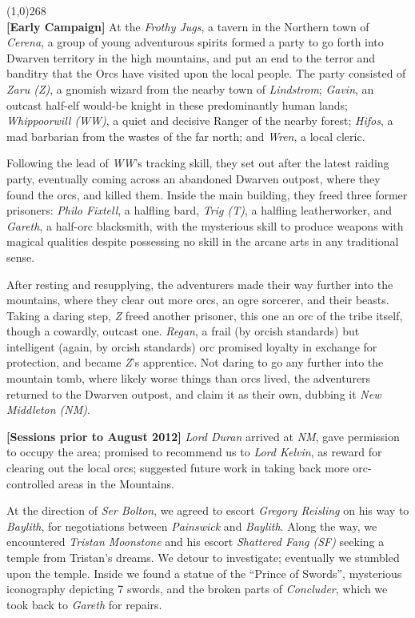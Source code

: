 \documentclass[letterpaper]{article}
\newcommand{\colline}{\noindent\line(1,0){268} \\}
\newcommand{\e}[1]{\emph{#1}}
\newcommand{\B}[1]{\textbf{#1}}
\newenvironment{notesection}[1]
{\noindent {\huge \B{#1}} \par
\vspace{-0.75em}
\colline
\begingroup\fontsize{9pt}{12pt}\selectfont}
{\endgroup}
\begin{document}
\begin{notesection}{Events}
\B{[Early Campaign]} At the \e{Frothy Jugs}, a tavern in the Northern town of \e{Cerena}, a group of young adventurous spirits formed a party to go forth into Dwarven territory in the high mountains, and put an end to the terror and banditry that the Orcs have visited upon the local people. The party consisted of \e{Zaru (Z)}, a gnomish wizard from the nearby town of \e{Lindstrom}; \e{Gavin}, an outcast half-elf would-be knight in these predominantly human lands; \e{Whippoorwill (WW)}, a quiet and decisive Ranger of the nearby forest; \e{Hifos}, a mad barbarian from the wastes of the far north; and \e{Wren}, a local cleric.

Following the lead of \e{WW}'s tracking skill, they set out after the latest raiding party, eventually coming across an abandoned Dwarven outpost, where they found the orcs, and killed them.  Inside the main building, they freed three former prisoners: \e{Philo Fixtell}, a halfling bard, \e{Trig (T)}, a halfling leatherworker, and \e{Gareth}, a half-orc blacksmith, with the mysterious skill to produce weapons with magical qualities despite possessing no skill in the arcane arts in any traditional sense.

After resting and resupplying, the adventurers made their way further into the mountains, where they clear out more orcs, an ogre sorcerer, and their beasts. Taking a daring step, \e{Z} freed another prisoner, this one an orc of the tribe itself, though a cowardly, outcast one.  \e{Regan}, a frail (by orcish standards) but intelligent (again, by orcish standards) orc promised loyalty in exchange for protection, and became \e{Z}'s apprentice. Not daring to go any further into the mountain tomb, where likely worse things than orcs lived, the adventurers returned to the Dwarven outpost, and claim it as their own, dubbing it \e{New Middleton (NM)}.

\B{[Sessions prior to August 2012]} \e{Lord Duran} arrived at \e{NM}, gave permission to occupy the area; promised to recommend us to \e{Lord Kelvin}, as reward for clearing out the local orcs; suggested future work in taking back more orc-controlled areas in the Mountains. 

At the direction of \e{Ser Bolton}, we agreed to escort \e{Gregory Reisling} on his way to \e{Baylith}, for negotiations between \e{Painswick} and \e{Baylith}.  Along the way, we encountered \e{Tristan Moonstone} and his escort \e{Shattered Fang (SF)} seeking a temple from Tristan's dreams. We detour to investigate; eventually we stumbled upon the temple.  Inside we found a statue of the ``Prince of Swords'', mysterious iconography depicting 7 swords, and the broken parts of \e{Concluder}, which we took back to \e{Gareth} for repairs.


\end{notesection}
\end{document}
